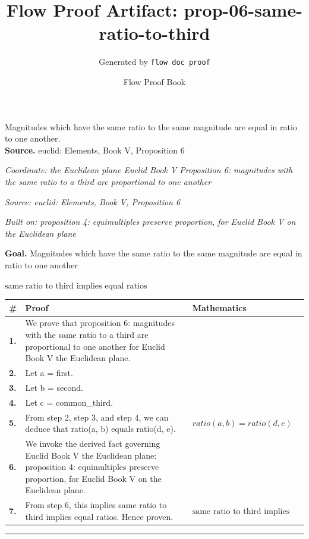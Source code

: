 \documentclass[11pt]{article}
\title{Flow Proof Artifact: prop-06-same-ratio-to-third}
\author{Generated by \texttt{flow doc proof}}
\date{Flow Proof Book}
\theoremstyle{definition}
\begin{document}
\maketitle
Magnitudes which have the same ratio to the same magnitude are equal in ratio to one another.\\[0.5em]
\textbf{Source.} euclid: Elements, Book V, Proposition 6\\[0.5em]
\bigskip
{}\par
\smallskip\noindent\textit{Coordinate: the Euclidean plane \cdot Euclid Book V \cdot Proposition 6: magnitudes with the same ratio to a third are proportional to one another}\par
\smallskip\noindent\textit{Source: euclid: Elements, Book V, Proposition 6}\par
\smallskip\noindent\textit{Built on: proposition 4: equimultiples preserve proportion, for Euclid Book V on the Euclidean plane}\par
\medskip
\noindent\textbf{Goal.} Magnitudes which have the same ratio to the same magnitude are equal in ratio to one another\par
\noindent$\displaystyle \text{same ratio to third implies equal ratios}$\par
\medskip
\noindent
\begin{tabular}{@{} >{\raggedright\arraybackslash}p{} >{\raggedright\arraybackslash}p{} >{\raggedleft\arraybackslash}p{} @{}}
\textbf{\#} & \textbf{Proof} & \textbf{Mathematics} \\
\midrule
\textbf{1.} & We prove that proposition 6: magnitudes with the same ratio to a third are proportional to one another for Euclid Book V the Euclidean plane. & \\[0.45em]
\textbf{2.} & Let a = first. & \\[0.45em]
\textbf{3.} & Let b = second. & \\[0.45em]
\textbf{4.} & Let c = common\_third. & \\[0.45em]
\textbf{5.} & From step 2, step 3, and step 4, we can deduce that ratio(a, b) equals ratio(d, e). & $\displaystyle ratio(a, b) = ratio(d, e)$ \\[0.45em]
\textbf{6.} & We invoke the derived fact governing Euclid Book V the Euclidean plane: proposition 4: equimultiples preserve proportion, for Euclid Book V on the Euclidean plane. & \\[0.45em]
\textbf{7.} & From step 6, this implies same ratio to third implies equal ratios. Hence proven. & $\displaystyle \text{same ratio to third implies equal ratios}$ \\[0.45em]
\bottomrule
\end{tabular}
\label{thm:Geometry-Euclid Book V-proposition_6_magnitudes_with_the_same_ratio_to_a_third_are_proportional_to_one_another}
\par\medskip\hrule
\end{document}
